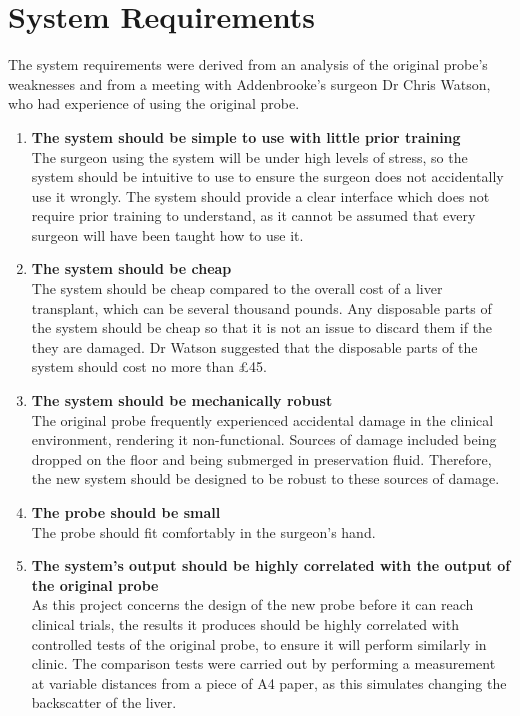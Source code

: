 \section{System Requirements}

The system requirements were derived from an analysis of the original probe's weaknesses and from a meeting with Addenbrooke's surgeon Dr Chris Watson, who had experience of using the original probe.


\begin{enumerate}
\item \label{req: simple} \textbf{The system should be simple to use with little prior training}\\
The surgeon using the system will be under high levels of stress, so the system should be intuitive to use to ensure the surgeon does not accidentally use it wrongly. The system should provide a clear interface which does not require prior training to understand, as it cannot be assumed that every surgeon will have been taught how to use it.

\item \label{req: cheap} \textbf{The system should be cheap}\\
The system should be cheap compared to the overall cost of a liver transplant, which can be several thousand pounds. Any disposable parts of the system should be cheap so that it is not an issue to discard them if the they are damaged. Dr Watson suggested that the disposable parts of the system should cost no more than £45.

\item \label{req: robust} \textbf{The system should be mechanically robust}\\
The original probe frequently experienced accidental damage in the clinical environment, rendering it non-functional. Sources of damage included being dropped on the floor and being submerged in preservation fluid. Therefore, the new system should be designed to be robust to these sources of damage.

\item \label{req: small} \textbf{The probe should be small}\\
The probe should fit comfortably in the surgeon's hand.


\item \label{req: correlation} \textbf{The system's output should be highly correlated with the output of the original probe}\\
As this project concerns the design of the new probe before it can reach clinical trials, the results it produces should be highly correlated with controlled tests of the original probe, to ensure it will perform similarly in clinic. The comparison tests were carried out by performing a measurement at variable distances from a piece of A4 paper, as this simulates changing the backscatter of the liver.




\end{enumerate}
